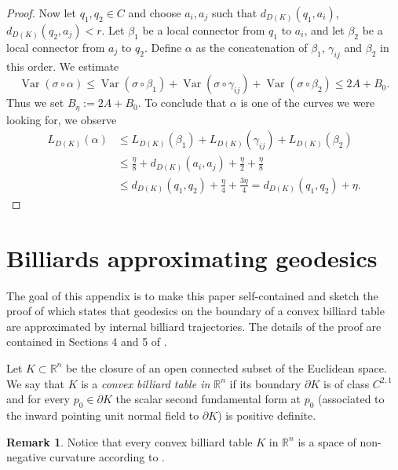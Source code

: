 \documentclass[11pt]{article}
\theoremstyle{definition}
\newtheorem{remark}[definition]{Remark}
\theoremstyle{remark}
\theoremstyle{plain}
\newcommand{\R}{\mathbb{R}}
\begin{document}
\begin{proof}
Now let $q_1,q_2\in C$ and choose $a_i,a_j$ such that $d_{D(K)}(q_1,a_i)$, $d_{D(K)}(q_2,a_j)<r$. Let $\beta_1$ be a local connector from $q_1$ to $a_i$, and let $\beta_2$ be a local connector from $a_j$ to $q_2$. Define $\alpha$ as the concatenation of $\beta_1$, $\gamma_{ij}$ and $\beta_2$ in this order. We estimate
$$\operatorname{Var}(\sigma\circ\alpha) \le \operatorname{Var}(\sigma\circ\beta_1) + \operatorname{Var}(\sigma\circ\gamma_{ij}) + \operatorname{Var}(\sigma\circ\beta_2) \le 2A+B_0.$$
Thus we set $B_\eta:=2A+B_0$. 
To conclude that $\alpha$ is one of the curves we were looking for, we observe
\begin{equation*}
\begin{split}
L_{D(K)}(\alpha) &\le L_{D(K)}(\beta_1) + L_{D(K)}(\gamma_{ij}) + L_{D(K)}(\beta_2)\\
&\le \frac{\eta}{8} + d_{D(K)}(a_i,a_j) + \frac{\eta}{2} + \frac{\eta}{8}\\
&\le d_{D(K)}(q_1,q_2) +\frac{\eta}{4}+\frac{3\eta}{4} = d_{D(K)}(q_1,q_2) +\eta.
\end{split}
\end{equation*}
\end{proof}


\section{Billiards approximating geodesics}

The goal of this appendix is to make this paper self-contained and sketch the proof of  which states that geodesics on the boundary of a convex billiard table are approximated by internal billiard trajectories. The details of the proof are contained in Sections 4 and 5 of \cite{Lange}.

Let $K\subset \R^n$ be the closure of an open connected subset of the Euclidean space. We say that $K$ is a \textit{convex billiard table in $\R^n$} if its boundary $\partial K$ is of class $C^{2,1}$ and for every $p_0\in \partial K$ the scalar second fundamental form at $p_0$ (associated to the inward pointing unit normal field to $\partial K$) is positive definite. 

\begin{remark}

Notice that every convex billiard table $K$ in $\R^n$ is a space of non-negative curvature according to .

\end{remark}
\end{document}
